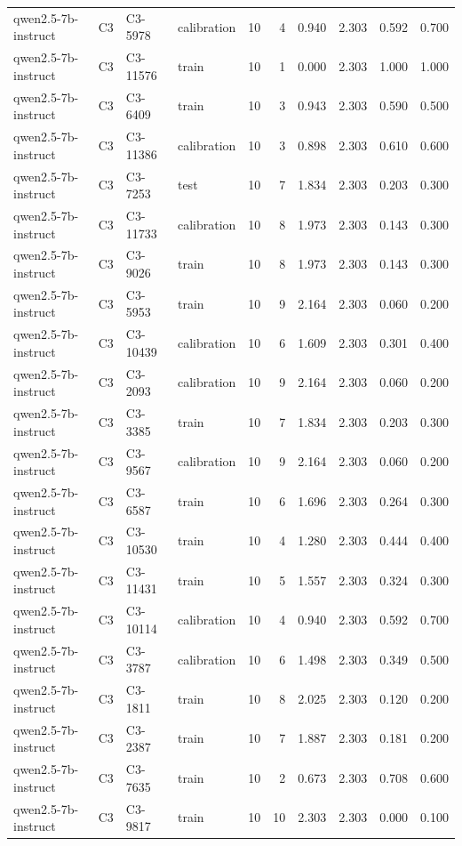 \begin{table}
\begin{tabular}{llllrrrrrr}
qwen2.5-7b-instruct & C3 & C3-5978 & calibration & 10 & 4 & 0.940 & 2.303 & 0.592 & 0.700 \\
qwen2.5-7b-instruct & C3 & C3-11576 & train & 10 & 1 & 0.000 & 2.303 & 1.000 & 1.000 \\
qwen2.5-7b-instruct & C3 & C3-6409 & train & 10 & 3 & 0.943 & 2.303 & 0.590 & 0.500 \\
qwen2.5-7b-instruct & C3 & C3-11386 & calibration & 10 & 3 & 0.898 & 2.303 & 0.610 & 0.600 \\
qwen2.5-7b-instruct & C3 & C3-7253 & test & 10 & 7 & 1.834 & 2.303 & 0.203 & 0.300 \\
qwen2.5-7b-instruct & C3 & C3-11733 & calibration & 10 & 8 & 1.973 & 2.303 & 0.143 & 0.300 \\
qwen2.5-7b-instruct & C3 & C3-9026 & train & 10 & 8 & 1.973 & 2.303 & 0.143 & 0.300 \\
qwen2.5-7b-instruct & C3 & C3-5953 & train & 10 & 9 & 2.164 & 2.303 & 0.060 & 0.200 \\
qwen2.5-7b-instruct & C3 & C3-10439 & calibration & 10 & 6 & 1.609 & 2.303 & 0.301 & 0.400 \\
qwen2.5-7b-instruct & C3 & C3-2093 & calibration & 10 & 9 & 2.164 & 2.303 & 0.060 & 0.200 \\
qwen2.5-7b-instruct & C3 & C3-3385 & train & 10 & 7 & 1.834 & 2.303 & 0.203 & 0.300 \\
qwen2.5-7b-instruct & C3 & C3-9567 & calibration & 10 & 9 & 2.164 & 2.303 & 0.060 & 0.200 \\
qwen2.5-7b-instruct & C3 & C3-6587 & train & 10 & 6 & 1.696 & 2.303 & 0.264 & 0.300 \\
qwen2.5-7b-instruct & C3 & C3-10530 & train & 10 & 4 & 1.280 & 2.303 & 0.444 & 0.400 \\
qwen2.5-7b-instruct & C3 & C3-11431 & train & 10 & 5 & 1.557 & 2.303 & 0.324 & 0.300 \\
qwen2.5-7b-instruct & C3 & C3-10114 & calibration & 10 & 4 & 0.940 & 2.303 & 0.592 & 0.700 \\
qwen2.5-7b-instruct & C3 & C3-3787 & calibration & 10 & 6 & 1.498 & 2.303 & 0.349 & 0.500 \\
qwen2.5-7b-instruct & C3 & C3-1811 & train & 10 & 8 & 2.025 & 2.303 & 0.120 & 0.200 \\
qwen2.5-7b-instruct & C3 & C3-2387 & train & 10 & 7 & 1.887 & 2.303 & 0.181 & 0.200 \\
qwen2.5-7b-instruct & C3 & C3-7635 & train & 10 & 2 & 0.673 & 2.303 & 0.708 & 0.600 \\
qwen2.5-7b-instruct & C3 & C3-9817 & train & 10 & 10 & 2.303 & 2.303 & 0.000 & 0.100 \\

\end{tabular}
\end{table}
